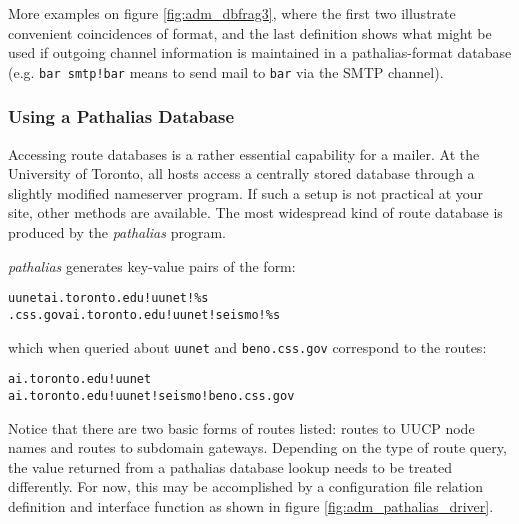 More examples on figure \vref{fig:adm_dbfrag3}, where the first
two illustrate convenient coincidences of format, and the last
definition shows what might be used if outgoing channel information
is maintained in a pathalias-format database (e.g. {\tt bar smtp!bar}
means to send mail to {\tt bar} via the SMTP channel).

\subsubsection{Using a Pathalias Database}

Accessing route databases is a rather essential capability for a mailer.
At the University of Toronto, all hosts access a centrally stored database
through a slightly modified nameserver program.
If such a setup is not practical at your site, other methods are available.
The most widespread kind of route database is produced by the {\em pathalias}
program.

{\em pathalias} generates key-value pairs of the form:
\begin{alltt}\medskip
  uunet    ai.toronto.edu!uunet!\%s
  .css.gov ai.toronto.edu!uunet!seismo!\%s
\medskip\end{alltt}
which when queried about {\tt uunet} and {\tt beno.css.gov} correspond to 
the routes:
\begin{alltt}\medskip
  ai.toronto.edu!uunet
  ai.toronto.edu!uunet!seismo!beno.css.gov
\medskip\end{alltt}

Notice that there are two basic forms of routes listed: routes to UUCP node
names and routes to subdomain gateways.  Depending on the type of route
query, the value returned from a pathalias database lookup needs to be
treated differently.
For now, this may be accomplished by a configuration
file relation definition and interface function as shown in figure
\vref{fig:adm_pathalias_driver}.


